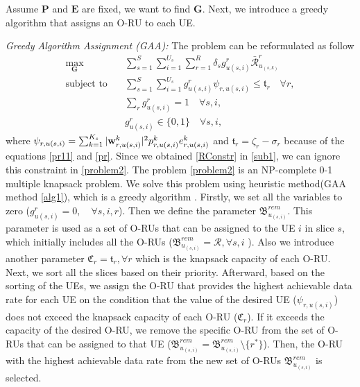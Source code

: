 \documentclass[lettersize,journal]{IEEEtran}
\begin{document}
Assume $\boldsymbol{P}$ and $\boldsymbol{E}$ are fixed, we want to find $\boldsymbol{G}$.
Next, we introduce a greedy algorithm that assigns an O-RU to each UE.

\textit{Greedy Algorithm Assignment (GAA):}
The problem can be reformulated as follow
\begin{subequations}\label{problem2}
\begin{alignat}{4}
\max\limits_{ \boldsymbol{G} }   \quad &  \sum_{s=1}^S\sum_{i=1}^{U_s}\sum_{r=1}^{R} \delta_s g^r_{u(s,i)}\bar{\mathcal{R}}^r_{u_{(s,k)}} \ \\
\text{subject to} \quad  & \sum_{s=1}^{S}\sum_{i=1}^{U_s} g_{u(s,i)}^r \psi_{r,u(s,i)}\leq \mathfrak{t}_r \quad \forall r,
 \label{p11} \\
& \sum_{r}g^r_{u(s,i)} = 1  \quad \forall s, i, \label{p12}\\
 & g^r_{u(s,i)} \in \{0,1\} \quad \forall s, i, \label{p13}
\end{alignat}
\end{subequations}
where $ \psi_{r,u(s,i)}=\sum_{k=1}^{K_s}|\bold{w}_{r,u(s,i)}^{k}|^2 p_{r,u(s,i)}^{k}  e^k_{r,u(s,i)}$
and $\mathfrak{t}_r = \zeta_r- \sigma_r$  because of the equations \eqref{pr11} and \eqref{pr}.
Since we obtained \eqref{RConstr} in \eqref{sub1}, we can ignore this constraint in \eqref{problem2}.
The problem \eqref{problem2} is an NP-complete 0-1 multiple knapsack problem.
We solve this problem using heuristic method(GAA method \ref{alg1}), which is a greedy algorithm \cite{akccay2007greedy,lee2018dynamic}.
Firstly, we set all the variables to zero ($g^r_{u(s,i)} = 0, \quad \forall s, i, r$).
Then we define the parameter ${\mathfrak{B}}^{rem}_{u_{(s,i)}}$. This parameter is used as a set of O-RUs that can be assigned to the UE $i$ in slice $s$, which initially includes all the O-RUs (${\mathfrak{B}}^{rem}_{u_{(s,i)}} = \mathcal{R}, \forall s, i$ ).
Also we introduce another parameter $ \mathfrak{C}_r = \mathfrak{t}_r, \forall r$
which is the knapsack capacity of each O-RU.
Next, we sort all the slices based on their priority.
Afterward, based on the sorting of the UEs,
we assign the O-RU that provides the highest achievable data rate for each UE on the condition that the value of the desired UE ($\psi_{r,u(s,i)}$) does not exceed the knapsack capacity of each O-RU ($ \mathfrak{C}_r$).
If it exceeds the capacity of the desired O-RU, we remove the specific O-RU from the set of O-RUs that can be assigned to that UE (${\mathfrak{B}}^{rem}_{u_{(s,i)}} = {\mathfrak{B}}^{rem}_{u_{(s,i)}} \setminus \{{r^*}\} $). Then, the O-RU with the highest achievable data rate from the new set of O-RUs ${\mathfrak{B}}^{rem}_{u_{(s,i)}}$ is selected.
\end{document}
